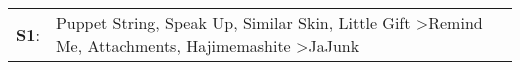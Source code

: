 \begin{supertabular}{p{0.03\textwidth}p{0.92\textwidth}}
 \textbf{S1}:  &  Puppet String\textsuperscript{}, \enspace Speak Up\textsuperscript{}, \enspace Similar Skin\textsuperscript{}, \enspace Little Gift\textsuperscript{} \textgreater \enspace Remind Me\textsuperscript{}, \enspace Attachments\textsuperscript{}, \enspace Hajimemashite\textsuperscript{} \textgreater \enspace JaJunk\textsuperscript{}  \enspace  \\
\end{supertabular}

